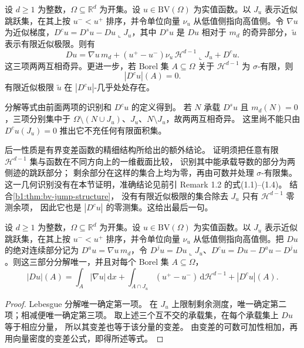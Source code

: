 \begin{theorem}
\label{b1:thm:bv-derivative-decomposition}
设 \(d\ge1\) 为整数，\(\Omega\subseteq\mathbb R^d\) 为开集。设 \(u\in\mathrm{BV}(\Omega)\) 为实值函数。以 \(J_u\) 表示近似跳跃集，在其上按 \(u^-<u^+\) 排序，并令单位向量 \(\nu_u\) 从低值侧指向高值侧。令 \(\nabla u\) 为近似梯度，\(D^cu=D^su-Du\llcorner J_u\)，其中 \(D^su\) 是 \(Du\) 相对于 \(m_d\) 的奇异部分，\(\widetilde u\) 表示有限近似极限。则有
\begin{equation}\label{b1:eq:bv-three-part-decomposition}
 Du=\nabla u\,m_d
    +(u^+-u^-)\nu_u\,
      \mathcal H^{d-1}\mathbin{\llcorner}J_u
    +D^cu.
\end{equation}
这三项两两互相奇异。更进一步，若 Borel 集 \(A\subseteq\Omega\)
关于 \(\mathcal H^{d-1}\) 为 \(\sigma\)-有限，则
\[
 |D^cu|(A)=0.
\]
有限近似极限 \(\widetilde u\) 在 \(|D^cu|\)-几乎处处存在。
\end{theorem}
\begin{proofsketch}
分解等式由前面两项的识别和 \(D^cu\) 的定义得到。
若 \(N\) 承载 \(D^su\) 且 \(m_d(N)=0\)，三项分别集中于
\(\Omega\setminus(N\cup J_u)\)、\(J_u\)、\(N\setminus J_u\)，故两两互相奇异。
这里尚不能只由 \(D^cu(J_u)=0\) 推出它不充任何有限面积集。

后一性质是有界变差函数的精细结构所给出的额外结论。
证明须把任意有限 \(\mathcal H^{d-1}\) 集与函数在不同方向上的一维截面比较，
识别其中能承载导数的部分为两侧迹的跳跃部分；
剩余部分在这样的集合上均为零，再由可数并处理 \(\sigma\)-有限集。
这一几何识别没有在本节证明，准确结论见前引 Remark 1.2 的式(1.1)--(1.4)。
结合\cref{b1:thm:bv-jump-structure}，
没有有限近似极限的集合除去 \(J_u\) 只有 \(\mathcal H^{d-1}\) 零测余项，
因此它也是 \(|D^cu|\) 的零测集。这给出最后一句。
\end{proofsketch}

\begin{proposition}\label{b1:prop:bv-decomposition-variation}
设 \(d\ge1\) 为整数，\(\Omega\subseteq\mathbb R^d\) 为开集。设 \(u\in\mathrm{BV}(\Omega)\) 为实值函数。以 \(J_u\) 表示近似跳跃集，在其上按 \(u^-<u^+\) 排序，并令单位向量 \(\nu_u\) 从低值侧指向高值侧。把 \(Du\) 的绝对连续部分记为 \(D^au=\nabla u\,m_d\)，令 \(D^ju=Du\llcorner J_u\)、\(D^cu=Du-D^au-D^ju\)。则这三部分分解唯一，并且对每个 Borel 集 \(A\subseteq\Omega\)，
\begin{equation}\label{b1:eq:bv-three-part-variation}
 |Du|(A)=\int_A|\nabla u|\,\mathrm dx
   +\int_{A\cap J_u}(u^+-u^-)\,\mathrm d\mathcal H^{d-1}
   +|D^cu|(A).
\end{equation}
\end{proposition}
\begin{proof}
Lebesgue 分解唯一确定第一项。
在 \(J_u\) 上限制剩余测度，唯一确定第二项；相减便唯一确定第三项。
取上述三个互不交的承载集，在每个承载集上 \(Du\) 等于相应分量，
所以其变差也等于该分量的变差。
由变差的可数可加性相加，再用向量密度的变差公式，即得所述等式。
\end{proof}


